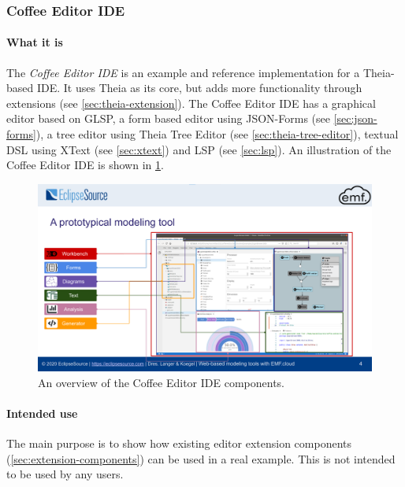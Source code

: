 \subsubsection{Coffee Editor IDE}\label{sec:coffee-ide}

\paragraph*{What it is}
The \emph{Coffee Editor IDE} is an example and reference implementation for a \gls{Theia}-based \gls{IDE}.
It uses Theia as its core, but adds more functionality through extensions (see \cref{sec:theia-extension}).
The Coffee Editor IDE has a graphical editor based on \gls{GLSP}, a form based editor using JSON-Forms (see \cref{sec:json-forms}), a tree editor using Theia Tree Editor (see \cref{sec:theia-tree-editor}), textual \acrshort{DSL} using XText (see \cref{sec:xtext}) and \gls{LSP} (see \cref{sec:lsp}).
An illustration of the Coffee Editor IDE is shown in \cref{fig:coffee-editor-overview}.

\begin{figure}[htbp] 
  \centering
  \includegraphics[width=\textwidth]{figures/coffee-maker-example}
  \caption[Coffee Editor IDE Overview]{An overview of the Coffee Editor IDE components.\cite[p.~4]{philiplangerWebbasedModelingTools2020}}\label{fig:coffee-editor-overview}
\end{figure}

\paragraph*{Intended use}
The main purpose is to show how existing editor extension components (\cref{sec:extension-components}) can be used in a real example.
This is not intended to be used by any users.

